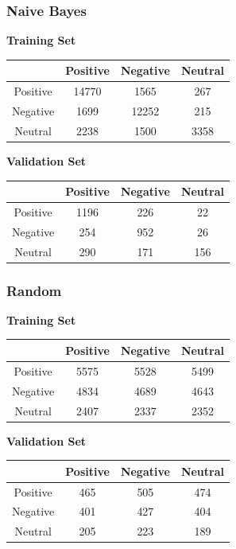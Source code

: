 \documentclass[12pt,a4paper]{article}
\begin{document}
\subsubsection{Naive Bayes}
\begin{center}
\textbf{Training Set}
\begin{center}
\begin{tabular}{|c|c|c|c|}
\hline
 & Positive & Negative & Neutral \\
\hline
Positive & 14770 & 1565 & 267 \\
\hline
Negative & 1699 & 12252 & 215 \\
\hline
Neutral & 2238 & 1500 & 3358 \\
\hline
\end{tabular}
\end{center}

\textbf{Validation Set}
\begin{center}
\begin{tabular}{|c|c|c|c|}
\hline
 & Positive & Negative & Neutral \\
\hline
Positive & 1196 & 226 & 22 \\
\hline
Negative & 254 & 952 & 26 \\
\hline
Neutral & 290 & 171 & 156 \\
\hline
\end{tabular}
\end{center}
\end{center}

\subsubsection{Random}
\begin{center}
\textbf{Training Set}
\begin{center}
\begin{tabular}{|c|c|c|c|}
\hline
 & Positive & Negative & Neutral \\
\hline
Positive & 5575 & 5528 & 5499 \\
\hline
Negative & 4834 & 4689 & 4643 \\
\hline
Neutral & 2407 & 2337 & 2352 \\
\hline
\end{tabular}
\end{center}

\textbf{Validation Set}
\begin{center}
\begin{tabular}{|c|c|c|c|}
\hline
 & Positive & Negative & Neutral \\
\hline
Positive & 465 & 505 & 474 \\
\hline
Negative & 401 & 427 & 404 \\
\hline
Neutral & 205 & 223 & 189 \\
\hline
\end{tabular}
\end{center}
\end{center}
\end{document}
